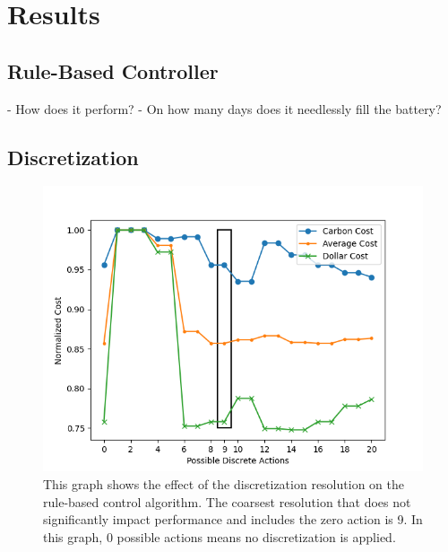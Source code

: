 \chapter{Results}
  \label{results}


\section{Rule-Based Controller}
- How does it perform?
- On how many days does it needlessly fill the battery?

\section{Discretization}
\begin{figure}[h]
  \centering
  \includegraphics[width=\figurewidth]{figures/discretization.png}
  \caption{This graph shows the effect of the discretization resolution on the rule-based control algorithm. The coarsest resolution that does not significantly impact performance and includes the zero action is 9. In this graph, 0 possible actions means no discretization is applied.}
  \label{fig:discretization}
\end{figure}

